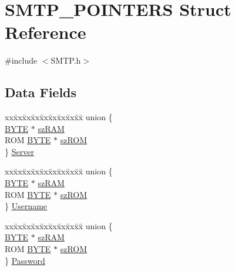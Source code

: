 \hypertarget{struct_s_m_t_p___p_o_i_n_t_e_r_s}{}\section{S\+M\+T\+P\+\_\+\+P\+O\+I\+N\+T\+E\+R\+S Struct Reference}
\label{struct_s_m_t_p___p_o_i_n_t_e_r_s}


{\ttfamily \#include $<$S\+M\+T\+P.\+h$>$}

\subsection*{Data Fields}
\begin{DoxyCompactItemize}
\item 
\begin{tabbing}
xx\=xx\=xx\=xx\=xx\=xx\=xx\=xx\=xx\=\kill
union \{\\
\>\hyperlink{_generic_type_defs_8h_a4ae1dab0fb4b072a66584546209e7d58}{BYTE} $\ast$ \hyperlink{struct_s_m_t_p___p_o_i_n_t_e_r_s_af20edf4e2cc85ba124bb787233bbd660}{szRAM}\\
\>ROM \hyperlink{_generic_type_defs_8h_a4ae1dab0fb4b072a66584546209e7d58}{BYTE} $\ast$ \hyperlink{struct_s_m_t_p___p_o_i_n_t_e_r_s_a89a99439d03fb333aeb42a4f1ac93feb}{szROM}\\
\} \hyperlink{struct_s_m_t_p___p_o_i_n_t_e_r_s_a2799615451a165d5b6da1909f58f7928}{Server}\\

\end{tabbing}\item 
\begin{tabbing}
xx\=xx\=xx\=xx\=xx\=xx\=xx\=xx\=xx\=\kill
union \{\\
\>\hyperlink{_generic_type_defs_8h_a4ae1dab0fb4b072a66584546209e7d58}{BYTE} $\ast$ \hyperlink{struct_s_m_t_p___p_o_i_n_t_e_r_s_af20edf4e2cc85ba124bb787233bbd660}{szRAM}\\
\>ROM \hyperlink{_generic_type_defs_8h_a4ae1dab0fb4b072a66584546209e7d58}{BYTE} $\ast$ \hyperlink{struct_s_m_t_p___p_o_i_n_t_e_r_s_a89a99439d03fb333aeb42a4f1ac93feb}{szROM}\\
\} \hyperlink{struct_s_m_t_p___p_o_i_n_t_e_r_s_aeb7dfa78287c7f11306e4255dad23bf3}{Username}\\

\end{tabbing}\item 
\begin{tabbing}
xx\=xx\=xx\=xx\=xx\=xx\=xx\=xx\=xx\=\kill
union \{\\
\>\hyperlink{_generic_type_defs_8h_a4ae1dab0fb4b072a66584546209e7d58}{BYTE} $\ast$ \hyperlink{struct_s_m_t_p___p_o_i_n_t_e_r_s_af20edf4e2cc85ba124bb787233bbd660}{szRAM}\\
\>ROM \hyperlink{_generic_type_defs_8h_a4ae1dab0fb4b072a66584546209e7d58}{BYTE} $\ast$ \hyperlink{struct_s_m_t_p___p_o_i_n_t_e_r_s_a89a99439d03fb333aeb42a4f1ac93feb}{szROM}\\
\} \hyperlink{struct_s_m_t_p___p_o_i_n_t_e_r_s_a7c5d6b22b13f0d5dae06b9c293764e23}{Password}\\


\end{tabbing}
\end{DoxyCompactItemize}
